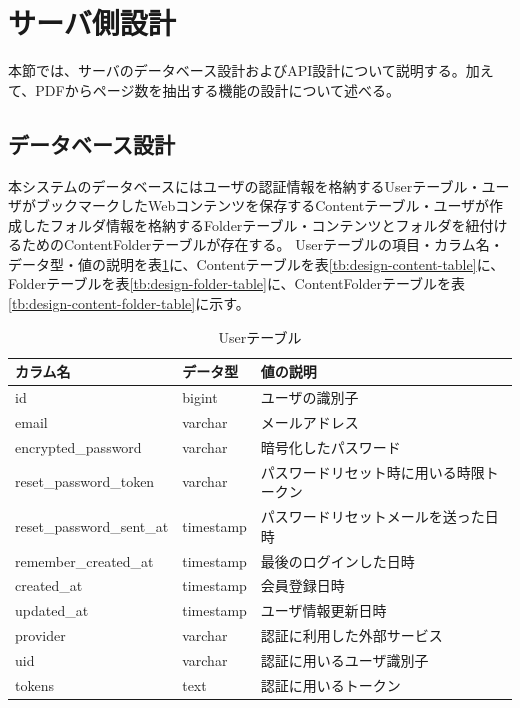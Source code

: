 \section{サーバ側設計}
本節では、サーバのデータベース設計およびAPI設計について説明する。加えて、PDFからページ数を抽出する機能の設計について述べる。

\subsection{データベース設計}
本システムのデータベースにはユーザの認証情報を格納するUserテーブル・ユーザがブックマークしたWebコンテンツを保存するContentテーブル・ユーザが作成したフォルダ情報を格納するFolderテーブル・コンテンツとフォルダを紐付けるためのContentFolderテーブルが存在する。
Userテーブルの項目・カラム名・データ型・値の説明を表\ref{tb:design-user-table}に、Contentテーブルを表\ref{tb:design-content-table}に、Folderテーブルを表\ref{tb:design-folder-table}に、ContentFolderテーブルを表\ref{tb:design-content-folder-table}に示す。

\begin{table}[htbp]
  \label{tb:design-user-table}
  \caption{Userテーブル}
  \begin{center}
    \begin{tabular}{|l|l|l|}
      \hline
      カラム名 & データ型 & 値の説明 \\\hline\hline
      id & bigint & ユーザの識別子 \\\hline
      email & varchar & メールアドレス \\\hline
      encrypted\_password & varchar & 暗号化したパスワード \\\hline
      reset\_password\_token & varchar & パスワードリセット時に用いる時限トークン \\\hline
      reset\_password\_sent\_at & timestamp & パスワードリセットメールを送った日時 \\\hline
      remember\_created\_at & timestamp & 最後のログインした日時 \\\hline
      created\_at & timestamp & 会員登録日時 \\\hline
      updated\_at & timestamp & ユーザ情報更新日時 \\\hline
      provider & varchar & 認証に利用した外部サービス \\\hline
      uid & varchar & 認証に用いるユーザ識別子 \\\hline
      tokens & text & 認証に用いるトークン \\\hline
    \end{tabular}
  \end{center}
\end{table}


